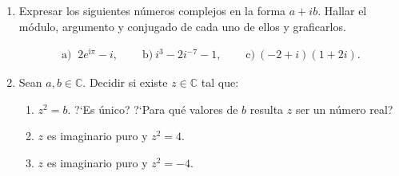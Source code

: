 \documentclass[a4paper,12pt,twoside,spanish,reqno]{amsbook}
\numberwithin{equation}{section}
\begin{document}
\begin{enumerate}
\vspace{.5cm}


 \item Expresar los siguientes n{\'u}meros complejos en la forma $a +i b$.
 Hallar el m{\'o}dulo, argumento y conjugado de cada uno de ellos y graficarlos.

 $$\begin{array}{lll}
 \text{a) }\ 2e^{\mathrm{i}\pi}-i,  \quad & \text{ b)} \  i^3 - 2i^{-7} -1, \quad &\text{ c)}\ (-2+i) (1+2i).
  \end{array}$$

\vspace{.5cm}

\item Sean $a,b\in\mathbb{C}$. Decidir si existe $z \in \mathbb{C}$ tal que:
\begin{enumerate}
  \item $z^2=b$. ?`Es \'unico? ?`Para qu\'e valores de $b$ resulta $z$ ser un n\'umero real?
  \item $z$ es imaginario puro y $z^2=4$.
  \item $z$ es imaginario puro y $z^2=-4$.
\end{enumerate}


\end{enumerate}
\end{document}
